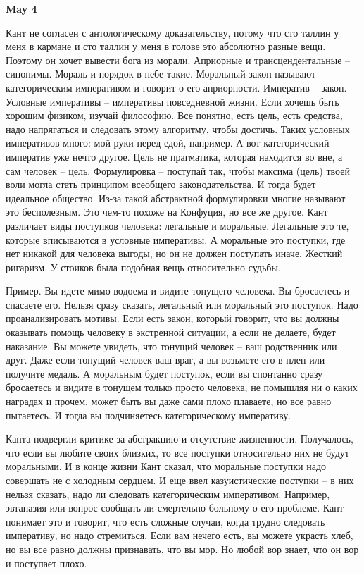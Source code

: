 \documentclass[a4paper, 12pt]{article}
\begin{document}
\hfill \textbf{May 4}

Кант не согласен с антологическому доказательству, потому что сто таллин у меня в кармане и сто таллин у меня в голове это абсолютно разные вещи. Поэтому он хочет вывести бога из морали. Априорные и трансцендентальные -- синонимы. Мораль и порядок в небе такие. Моральный закон называют категорическим императивом и говорит о его априорности. Императив -- закон. Условные императивы -- императивы повседневной жизни. Если хочешь быть хорошим физиком, изучай философию. Все понятно, есть цель, есть средства, надо напрягаться и следовать этому алгоритму, чтобы достичь. Таких условных императивов много: мой руки перед едой, например. А вот категорический императив уже нечто другое. Цель не прагматика, которая находится во вне, а сам человек -- цель. Формулировка -- поступай так, чтобы максима (цель) твоей воли могла стать принципом всеобщего законодательства. И тогда будет идеальное общество. Из-за такой абстрактной формулировки многие называют это бесполезным. Это чем-то похоже на Конфуция, но все же другое. Кант различает виды поступков человека: легальные и моральные. Легальные это те, которые вписываются в условные императивы. А моральные это поступки, где нет никакой для человека выгоды, но он не должен поступать иначе. Жесткий ригаризм. У стоиков была подобная вещь относительно судьбы. 

Пример. Вы идете мимо водоема и видите тонущего человека. Вы бросаетесь и спасаете его. Нельзя сразу сказать, легальный или моральный это поступок. Надо проанализировать мотивы. Если есть закон, который говорит, что вы должны оказывать помощь человеку в экстренной ситуации, а если не делаете, будет наказание. Вы можете увидеть, что тонущий человек -- ваш родственник или друг. Даже если тонущий человек ваш враг, а вы возьмете его в плен или получите медаль. А моральным будет поступок, если вы спонтанно сразу бросаетесь и видите в тонущем только просто человека, не помышляя ни о каких наградах и прочем, может быть вы даже сами плохо плаваете, но все равно пытаетесь. И тогда вы подчиняетесь категорическому императиву. 

Канта подвергли критике за абстракцию и отсутствие жизненности. Получалось, что если вы любите своих близких, то все поступки относительно них не будут моральными. И в конце жизни Кант сказал, что моральные поступки надо совершать не с холодным сердцем. И еще ввел казуистические поступки -- в них нельзя сказать, надо ли следовать категорическим императивом. Например, эвтаназия или вопрос сообщать ли смертельно больному о его проблеме. Кант понимает это и говорит, что есть сложные случаи, когда трудно следовать императиву, но надо стремиться. Если вам нечего есть, вы можете украсть хлеб, но вы все равно должны признавать, что вы мор. Но любой вор знает, что он вор и поступает плохо.
\end{document}
